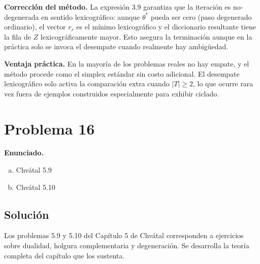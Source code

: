 \documentclass{article}
\begin{document}
\textbf{Corrección del método.} La expresión 3.9 garantiza que la iteración es no-degenerada en sentido lexicográfico: aunque $\theta^*$ pueda ser cero (paso degenerado ordinario), el vector $r_r$ es el mínimo lexicográfico y el diccionario resultante tiene la fila de $Z$ lexicográficamente mayor. Esto asegura la terminación aunque en la práctica solo se invoca el desempate cuando realmente hay ambigüedad.

\textbf{Ventaja práctica.} En la mayoría de los problemas reales no hay empate, y el método procede como el simplex estándar sin costo adicional. El desempate lexicográfico solo activa la comparación extra cuando $|T|\geq2$, lo que ocurre rara vez fuera de ejemplos construidos especialmente para exhibir ciclado.

\newpage
\section*{Problema 16}

\textbf{Enunciado.}
\begin{enumerate}[a)]
\item Chvátal 5.9
\item Chvátal 5.10
\end{enumerate}

\subsection*{Solución}

Los problemas 5.9 y 5.10 del Capítulo 5 de Chvátal corresponden a ejercicios sobre dualidad, holgura complementaria y degeneración. Se desarrolla la teoría completa del capítulo que los sustenta.
\end{document}
